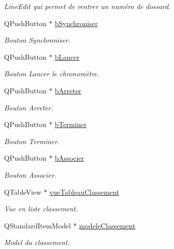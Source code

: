 \begin{DoxyCompactItemize}
\begin{DoxyCompactList}\small\item\em Line\+Edit qui permet de rentrer un numéro de dossard. \end{DoxyCompactList}\item 
Q\+Push\+Button $\ast$ \hyperlink{class_i_h_m_chrono_cross_aaef501bd1190a5ec06a214d3265b8c0b}{b\+Synchroniser}
\begin{DoxyCompactList}\small\item\em Bouton Synchroniser. \end{DoxyCompactList}\item 
Q\+Push\+Button $\ast$ \hyperlink{class_i_h_m_chrono_cross_a1b0a7c5e58d6a9f873cdc912d67b8de9}{b\+Lancer}
\begin{DoxyCompactList}\small\item\em Bouton Lancer le chronomètre. \end{DoxyCompactList}\item 
Q\+Push\+Button $\ast$ \hyperlink{class_i_h_m_chrono_cross_a75ce4fcdab11095834fe3f9e931f8964}{b\+Arreter}
\begin{DoxyCompactList}\small\item\em Bouton Arreter. \end{DoxyCompactList}\item 
Q\+Push\+Button $\ast$ \hyperlink{class_i_h_m_chrono_cross_a63721ec2d7d51b11b164b4502ace8262}{b\+Terminer}
\begin{DoxyCompactList}\small\item\em Bouton Terminer. \end{DoxyCompactList}\item 
Q\+Push\+Button $\ast$ \hyperlink{class_i_h_m_chrono_cross_aec2458a0c2ff0d2c37fa409fb8e99ce7}{b\+Associer}
\begin{DoxyCompactList}\small\item\em Bouton Associer. \end{DoxyCompactList}\item 
Q\+Table\+View $\ast$ \hyperlink{class_i_h_m_chrono_cross_a199204276756844adbd6ca3c9030ad2f}{vue\+Tableau\+Classement}
\begin{DoxyCompactList}\small\item\em Vue en liste classement. \end{DoxyCompactList}\item 
Q\+Standard\+Item\+Model $\ast$ \hyperlink{class_i_h_m_chrono_cross_ac25c95280801f36c43a1c41cf2fa253e}{modele\+Classement}
\begin{DoxyCompactList}\small\item\em Model du classement. \end{DoxyCompactList}\item 

\end{DoxyCompactItemize}
